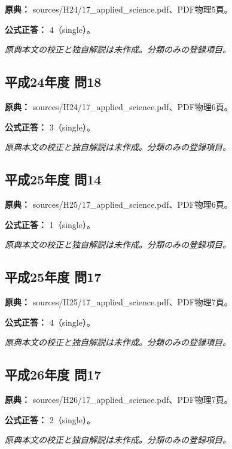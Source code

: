 \noindent\textbf{原典：} sources/H24/17\_applied\_science.pdf、PDF物理5頁。

\textbf{公式正答：} 4（single）。

\par\textit{原典本文の校正と独自解説は未作成。分類のみの登録項目。}

\subsection{平成24年度 問18}
\label{q:h24-reg-applied-18}

\noindent\textbf{原典：} sources/H24/17\_applied\_science.pdf、PDF物理6頁。

\textbf{公式正答：} 3（single）。

\par\textit{原典本文の校正と独自解説は未作成。分類のみの登録項目。}

\subsection{平成25年度 問14}
\label{q:h25-reg-applied-14}

\noindent\textbf{原典：} sources/H25/17\_applied\_science.pdf、PDF物理6頁。

\textbf{公式正答：} 1（single）。

\par\textit{原典本文の校正と独自解説は未作成。分類のみの登録項目。}

\subsection{平成25年度 問17}
\label{q:h25-reg-applied-17}

\noindent\textbf{原典：} sources/H25/17\_applied\_science.pdf、PDF物理7頁。

\textbf{公式正答：} 4（single）。

\par\textit{原典本文の校正と独自解説は未作成。分類のみの登録項目。}

\subsection{平成26年度 問17}
\label{q:h26-reg-applied-17}

\noindent\textbf{原典：} sources/H26/17\_applied\_science.pdf、PDF物理7頁。

\textbf{公式正答：} 2（single）。

\par\textit{原典本文の校正と独自解説は未作成。分類のみの登録項目。}


